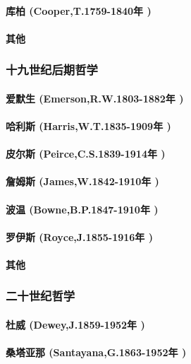 \documentclass[UTF8]{../RepresentationUniverse}
\begin{document}
    \paragraph{库柏 (Cooper,T.1759-1840年 )}
    \paragraph{其他}
\subsubsection{十九世纪后期哲学}
    \paragraph{爱默生 (Emerson,R.W.1803-1882年 )}
    \paragraph{哈利斯 (Harris,W.T.1835-1909年 )}
    \paragraph{皮尔斯 (Peirce,C.S.1839-1914年 )}
    \paragraph{詹姆斯 (James,W.1842-1910年 )}
    \paragraph{波温 (Bowne,B.P.1847-1910年 )}
    \paragraph{罗伊斯 (Royce,J.1855-1916年 )}
    \paragraph{其他}
\subsubsection{二十世纪哲学}
    \paragraph{杜威 (Dewey,J.1859-1952年 )}
    \paragraph{桑塔亚那 (Santayana,G.1863-1952年 )}
\end{document}
